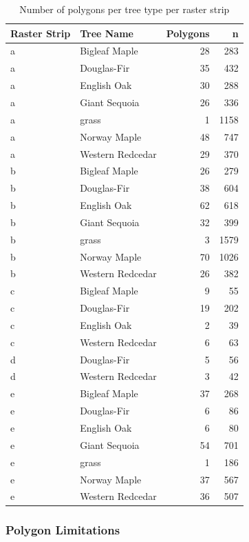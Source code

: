 \documentclass[12pt,twoside]{reedthesis}
\begin{document}
\begin{table}

\caption{\label{tab:polyCountsTrees}Number of polygons per tree type per raster strip}
\centering
\begin{tabular}[t]{l|l|r|r}
\hline
Raster Strip & Tree Name & Polygons & n\\
\hline
a & Bigleaf Maple & 28 & 283\\
\hline
a & Douglas-Fir & 35 & 432\\
\hline
a & English Oak & 30 & 288\\
\hline
a & Giant Sequoia & 26 & 336\\
\hline
a & grass & 1 & 1158\\
\hline
a & Norway Maple & 48 & 747\\
\hline
a & Western Redcedar & 29 & 370\\
\hline
b & Bigleaf Maple & 26 & 279\\
\hline
b & Douglas-Fir & 38 & 604\\
\hline
b & English Oak & 62 & 618\\
\hline
b & Giant Sequoia & 32 & 399\\
\hline
b & grass & 3 & 1579\\
\hline
b & Norway Maple & 70 & 1026\\
\hline
b & Western Redcedar & 26 & 382\\
\hline
c & Bigleaf Maple & 9 & 55\\
\hline
c & Douglas-Fir & 19 & 202\\
\hline
c & English Oak & 2 & 39\\
\hline
c & Western Redcedar & 6 & 63\\
\hline
d & Douglas-Fir & 5 & 56\\
\hline
d & Western Redcedar & 3 & 42\\
\hline
e & Bigleaf Maple & 37 & 268\\
\hline
e & Douglas-Fir & 6 & 86\\
\hline
e & English Oak & 6 & 80\\
\hline
e & Giant Sequoia & 54 & 701\\
\hline
e & grass & 1 & 186\\
\hline
e & Norway Maple & 37 & 567\\
\hline
e & Western Redcedar & 36 & 507\\
\hline
\end{tabular}
\end{table}
\hypertarget{polygon-limitations}{%
\subsubsection{Polygon Limitations}\label{polygon-limitations}}
\end{document}
